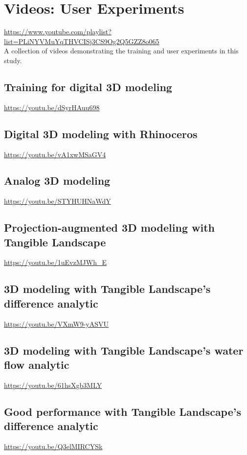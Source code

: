 \section{Videos: User Experiments}\label{appendix:experiment_videos}
\url{https://www.youtube.com/playlist?list=PLiNYVMuYqTHVCISj3CS9Og2Q5GZZ8o065}\\

\noindent
A collection of videos demonstrating 
the training and user experiments in this study. 

\subsection{Training for digital 3D modeling}\label{videos:training}
\url{https://youtu.be/dSyrHAuu698}

\subsection{Digital 3D modeling with Rhinoceros}\label{videos:digital}
\url{https://youtu.be/vA1xwMSaGV4}

\subsection{Analog 3D modeling}\label{videos:analog}
\url{https://youtu.be/STYHUHNaWdY}

\subsection{Projection-augmented 3D modeling with Tangible Landscape}\label{videos:augmented}
\url{https://youtu.be/1uEvzMJWh_E}

\subsection{3D modeling with Tangible Landscape's difference analytic}\label{videos:difference}
\url{https://youtu.be/VXmW9-yASVU}

\subsection{3D modeling with Tangible Landscape's water flow analytic}
\label{videos:water}
\url{https://youtu.be/61hsXgb3MLY}

\subsection{Good performance with Tangible Landscape's difference analytic}\label{videos:new_difference}
\url{https://youtu.be/Q3elMIRCYSk}
